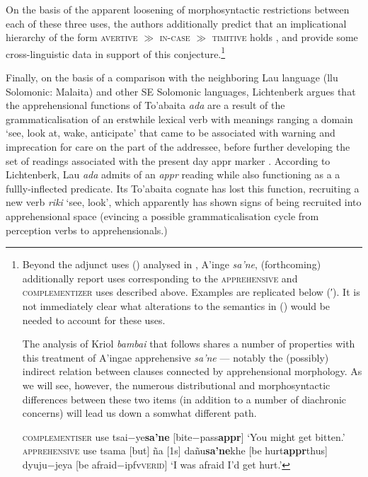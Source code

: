  On the basis of the apparent loosening of morphosyntactic restrictions between each of these three uses, the authors additionally predict that an implicational hierarchy of the form \textsc{avertive $\gg$ in-case $ \gg $ timitive} holds \citeyearpar[386-87]{AnderBois2020}, and provide some cross-linguistic data in support of this conjecture.\footnote{Beyond the adjunct uses () analysed in \citealt{AnderBois2020}, A'inge \textit{\textdblhyphen sa'ne}, \citet{Dabkowski} (forthcoming) additionally report uses corresponding to the \textsc{apprehensive} and \textsc{complementizer} uses described above. Examples are replicated below (′). It is not immediately clear what alterations to the semantics in () would be needed to account for these uses.
	
The analysis of Kriol \textit{bambai} that follows shares a number of properties with this treatment of A'ingae apprehensive \textdblhyphen\textit{sa'ne} --- notably the (possibly) indirect relation between clauses connected by apprehensional morphology. As we will see, however, the numerous distributional and morphosyntactic differences between these two items (in addition to a number of diachronic concerns) will lead us down a somwhat different path.

\pex[glstyle=nlevel,aboveglftskip=.2ex,belowglpreambleskip=0ex,belowexskip=0ex,aboveexskip=1ex,exno=\getref{con}′]   
\a[label=d]\begingl\glpreamble\textsc{complementiser} use \endpreamble
tsai−ye\textdblhyphen\textbf{sa’ne} [bite−pass\textdblhyphen\textbf{\gls{appr}}]
\glft`You might get bitten.'
\endgl
\a[label=e]\begingl\glpreamble \textsc{apprehensive} use \endpreamble
tsama [but]
ña [1s]
dañu\textdblhyphen\textbf{sa'ne}\textdblhyphen khe [be hurt\textdblhyphen\textbf{\gls{appr}}\textdblhyphen thus]
dyuju−je\textdblhyphen ya [be afraid−\gls{ipfv}\textdblhyphen\textsc{verid}]
\glft`I was afraid I'd get hurt.'%
\endgl
\xe}



Finally, on the basis of a comparison with the neighboring Lau language (\gls{llu} Solomonic: Malaita) and other SE Solomonic languages, Lichtenberk argues that the apprehensional functions of To'abaita \textit{ada} are a result of the grammaticalisation of an erstwhile lexical verb with meanings ranging a domain `see, look at, wake, anticipate' that came to be associated with warning and imprecation for care on the part of the addressee, before further developing the set of readings associated with the present day {\sc appr} marker \citeyearpar[303-4]{Lichtenberk1995}. According to Lichtenberk, Lau \textit{ada} admits of an \textsl{appr} reading while also functioning as a a fullly-inflected predicate. Its To'abaita cognate has lost this function, recruiting a new verb \textit{riki} `see, look', which apparently has shown signs of being recruited into apprehensional space (evincing a possible grammaticalisation cycle from perception verbs to apprehensionals.)





